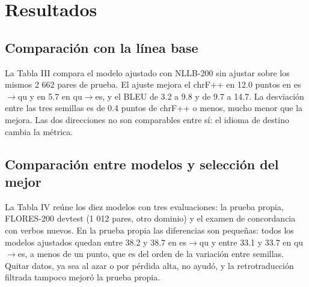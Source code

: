 \documentclass[conference]{IEEEtran}
\begin{document}
\section{Resultados}
\subsection{Comparación con la línea base}
La Tabla III compara el modelo ajustado con NLLB-200 sin ajustar sobre los mismos 2 662 pares de prueba. El ajuste mejora el chrF++ en 12.0 puntos en es$\rightarrow$qu y en 5.7 en qu$\rightarrow$es, y el BLEU de 3.2 a 9.8 y de 9.7 a 14.7. La desviación entre las tres semillas es de 0.4 puntos de chrF++ o menos, mucho menor que la mejora. Las dos direcciones no son comparables entre sí: el idioma de destino cambia la métrica.

\begin{table}[!t]
\caption{Resultados en la prueba (chrF++ y BLEU; media $\pm$ d. e. de 3 semillas)}
\label{tab:resultados}
\centering\small
{}
\end{table}
\subsection{Comparación entre modelos y selección del mejor}
La Tabla IV reúne los diez modelos con tres evaluaciones: la prueba propia, FLORES-200 devtest (1 012 pares, otro dominio) y el examen de concordancia con verbos nuevos. En la prueba propia las diferencias son pequeñas: todos los modelos ajustados quedan entre 38.2 y 38.7 en es$\rightarrow$qu y entre 33.1 y 33.7 en qu$\rightarrow$es, a menos de un punto, que es del orden de la variación entre semillas. Quitar datos, ya sea al azar o por pérdida alta, no ayudó, y la retrotraducción filtrada tampoco mejoró la prueba propia.
\end{document}
